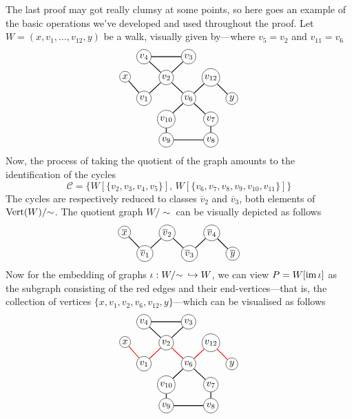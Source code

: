 The last proof may got really clumsy at some points, so here goes an example of
the basic operations we've developed and used throughout the proof. Let \(W =
(x, v_1, \dots, v_{12}, y)\) be a walk, visually given by---where \(v_5 =
v_2\) and \(v_{11} = v_6\)
\[
\begin{tikzcd}[%
  , cells={nodes={circle, draw, inner sep=1.5pt}}
  , every arrow/.append style={dash,thick}
  , row sep=tiny
  , column sep=tiny
  ]
            &v_4 \ar[rr] \ar[dr] & &v_3 \ar[dl] & &
  \\
  x \ar[dr] & &v_2 \ar[dl] \ar[dr] & &v_{12} \ar[dr] &
  \\
            &v_1 & &v_6 \ar[ur] \ar[dl] \ar[dr] & &y
  \\
            & &v_{10} \ar[d] & &v_7 \ar[d] &
  \\
            & &v_9 \ar[rr] & &v_8 &
\end{tikzcd}
\]
Now, the process of taking the quotient of the graph amounts to the
identification of the cycles
\[
  \mathcal C = \{
    W[\{v_2, v_3, v_4, v_5\}],\,
    W[\{v_6, v_7, v_8, v_9, v_{10}, v_{11}\}]
  \}
\]
The cycles are respectively reduced to classes \(\overline v_2\) and \(\overline
v_3\), both elements of \(\operatorname{Vert}(W)/{\sim}\). The quotient graph \(W/{\sim}\) can be visually
depicted as follows
\[
\begin{tikzcd}[%
  , cells={nodes={circle, draw, inner sep=1.5pt}}
  , every arrow/.append style={dash,thick}
  , row sep=tiny
  , column sep=tiny
  ]
  \overline x \ar[dr]
  & &\overline v_2 \ar[dl] \ar[dr] & &\overline v_4 \ar[dl] \ar[dr] &
  \\
  &\overline v_1 & &\overline v_3 & &\overline y
\end{tikzcd}
\]
Now for the embedding of graphs \(\iota: W/{\sim}\, \hookrightarrow W\), we can view
\(P = W[\operatorname{im} \iota]\) as the subgraph consisting of the red edges and their
end-vertices---that is, the collection of vertices
\(\{x, v_1, v_2, v_6, v_{12}, y\}\)---which can be visualised as follows
\[
\begin{tikzcd}[%
  , cells={nodes={circle, draw, inner sep=1.5pt}}
  , every arrow/.append style={dash,thick}
  , row sep=tiny
  , column sep=tiny
  ]
            &v_4 \ar[rr] \ar[dr] & &v_3 \ar[dl] & &
  \\
  x \ar[dr, color=red] & &v_2 \ar[dl, color=red] \ar[dr, color=red]
                        & &v_{12} \ar[dr, color=red] &
  \\
            &v_1 & &v_6 \ar[ur, color=red] \ar[dl] \ar[dr] & &y
  \\
            & &v_{10} \ar[d] & &v_7 \ar[d] &
  \\
            & &v_9 \ar[rr] & &v_8 &
\end{tikzcd}
\]

